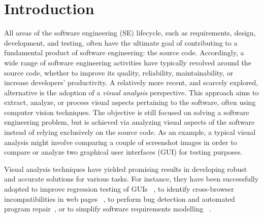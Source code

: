 	\section{Introduction}\label{sec:introduction}


All areas of the software engineering (SE) lifecycle, 
such as requirements, design, development, and testing, 
often have the ultimate goal of contributing to a
fundamental product of software engineering: the source code.
Accordingly, a wide range of software engineering activities have
typically revolved around the source code,
whether to improve its quality, reliability, maintainability,
 or increase developers' productivity.
A relatively more recent, and scarcely explored, 
alternative is the adoption of a 
\emph{visual analysis} perspective.
This approach aims to extract, analyze, or process visual aspects
pertaining to the software, often using computer vision techniques. 
The objective is still focused on solving a software engineering problem, 
but is achieved via analyzing visual aspects of the software instead of relying 
exclusively on the source code.
As an example, a typical visual analysis  
might involve comparing a couple of screenshot images in order  
to compare or analyze two graphical user interfaces (GUI)
for testing purposes. 

Visual analysis techniques have yielded promising results 
in developing robust and accurate solutions
for various tasks.
For instance, they have been successfully adopted
to improve regression testing of GUIs
~\cite{Chang-2010-CHI, Alegroth-2013-ICST, Lin-2014-TSE},
to identify cross-browser incompatibilities in web pages
~\cite{Semenenko-2013-ICSM,Choudhary-2013-ICSE,Selay-2014-DICTA}, to 
perform bug detection and automated program repair~\cite{Mahajan-2014-ASE, Stocco-2018-FSE}, 
or to simplify software requirements modelling
~\cite{Li-2010-CHI, Scharf-2013-ICSE}.

